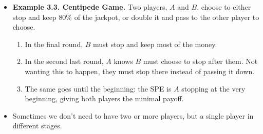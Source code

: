 \documentclass[notitlepage]{article}
\begin{document}
\begin{itemize}
    \begin{itemize}
        \item We start with a 1-student case.
        
        \begin{figure}[h]
        \centering
        \resizebox{0.4\textwidth}{!}{
        
        }
        \end{figure}

        \begin{enumerate}
            \item If the student comes, the professor must choose to comply.
            \item Knowing this, the student must choose to go than not going.
        \end{enumerate}

        \item If we extend this to \(n\) students coming one by one, the unique SPE is every student going and the professor complying with everyone.
        \item The \textbf{chain store paradox}: Why do new companies keep entering, and why don't incumbents start a price war?
        \end{itemize}

    \item \textbf{Example 3.3. Centipede Game.} Two players, \(A\) and \(B\), choose to either stop and keep 80\% of the jackpot, or double it and pass to the other player to choose.

    \begin{figure}[h]
    \centering
    \resizebox{0.7\textwidth}{!}{
    
    }
    \end{figure}

    \begin{enumerate}
        \item In the final round, \(B\) must stop and keep most of the money.
        \item In the second last round, \(A\) knows \(B\) must choose to stop after them. Not wanting this to happen, they must stop there instead of passing it down.
        \item The same goes until the beginning: the SPE is \(A\) stopping at the very beginning, giving both players the minimal payoff.
    \end{enumerate}

    \item Sometimes we don't need to have two or more players, but a single player in different stages.


\end{itemize}
\end{document}
